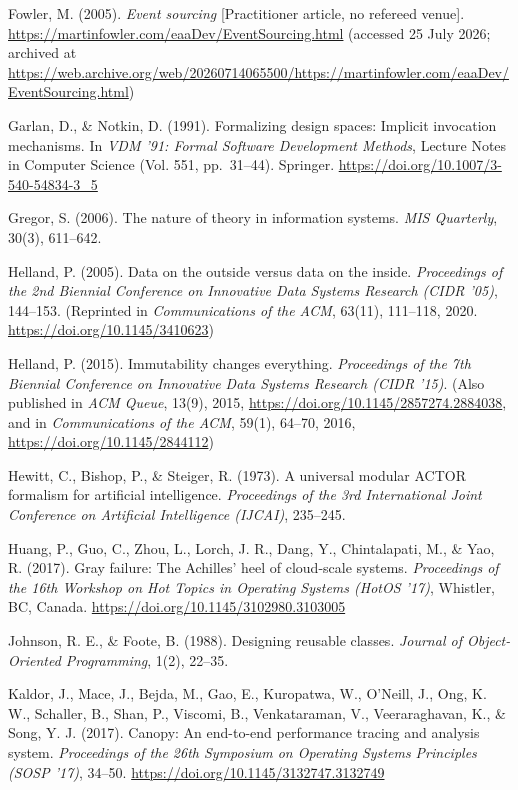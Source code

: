 \documentclass[
]{article}
\begin{document}
Fowler, M. (2005). \emph{Event sourcing} {[}Practitioner article, no
refereed venue{]}.
\url{https://martinfowler.com/eaaDev/EventSourcing.html} (accessed 25
July 2026; archived at
\url{https://web.archive.org/web/20260714065500/https://martinfowler.com/eaaDev/EventSourcing.html})

Garlan, D., \& Notkin, D. (1991). Formalizing design spaces: Implicit
invocation mechanisms. In \emph{VDM '91: Formal Software Development
Methods}, Lecture Notes in Computer Science (Vol. 551, pp.~31--44).
Springer. \url{https://doi.org/10.1007/3-540-54834-3_5}

Gregor, S. (2006). The nature of theory in information systems.
\emph{MIS Quarterly}, 30(3), 611--642.

Helland, P. (2005). Data on the outside versus data on the inside.
\emph{Proceedings of the 2nd Biennial Conference on Innovative Data
Systems Research (CIDR '05)}, 144--153. (Reprinted in
\emph{Communications of the ACM}, 63(11), 111--118, 2020.
\url{https://doi.org/10.1145/3410623})

Helland, P. (2015). Immutability changes everything. \emph{Proceedings
of the 7th Biennial Conference on Innovative Data Systems Research (CIDR
'15)}. (Also published in \emph{ACM Queue}, 13(9), 2015,
\url{https://doi.org/10.1145/2857274.2884038}, and in
\emph{Communications of the ACM}, 59(1), 64--70, 2016,
\url{https://doi.org/10.1145/2844112})

Hewitt, C., Bishop, P., \& Steiger, R. (1973). A universal modular ACTOR
formalism for artificial intelligence. \emph{Proceedings of the 3rd
International Joint Conference on Artificial Intelligence (IJCAI)},
235--245.

Huang, P., Guo, C., Zhou, L., Lorch, J. R., Dang, Y., Chintalapati, M.,
\& Yao, R. (2017). Gray failure: The Achilles' heel of cloud-scale
systems. \emph{Proceedings of the 16th Workshop on Hot Topics in
Operating Systems (HotOS '17)}, Whistler, BC, Canada.
\url{https://doi.org/10.1145/3102980.3103005}

Johnson, R. E., \& Foote, B. (1988). Designing reusable classes.
\emph{Journal of Object-Oriented Programming}, 1(2), 22--35.

Kaldor, J., Mace, J., Bejda, M., Gao, E., Kuropatwa, W., O'Neill, J.,
Ong, K. W., Schaller, B., Shan, P., Viscomi, B., Venkataraman, V.,
Veeraraghavan, K., \& Song, Y. J. (2017). Canopy: An end-to-end
performance tracing and analysis system. \emph{Proceedings of the 26th
Symposium on Operating Systems Principles (SOSP '17)}, 34--50.
\url{https://doi.org/10.1145/3132747.3132749}
\end{document}
